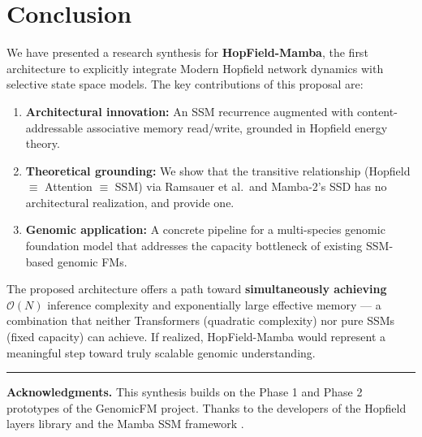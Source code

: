 \documentclass[11pt,a4paper]{article}
\numberwithin{equation}{section}
\begin{document}
\section{Conclusion}
\label{sec:conclusion}

We have presented a research synthesis for \textbf{HopField-Mamba}, the first architecture
to explicitly integrate Modern Hopfield network dynamics with selective state space models.
The key contributions of this proposal are:

\begin{enumerate}
    \item \textbf{Architectural innovation:} An SSM recurrence augmented with
    content-addressable associative memory read/write, grounded in Hopfield energy
    theory.
    \item \textbf{Theoretical grounding:} We show that the transitive relationship
    (Hopfield $\equiv$ Attention $\equiv$ SSM) via Ramsauer et al.\ and Mamba-2's SSD
    has no architectural realization, and provide one.
    \item \textbf{Genomic application:} A concrete pipeline for a multi-species genomic
    foundation model that addresses the capacity bottleneck of existing SSM-based
    genomic FMs.
\end{enumerate}

The proposed architecture offers a path toward \textbf{simultaneously achieving}
$\mathcal{O}(N)$ inference complexity and exponentially large effective memory --- a
combination that neither Transformers (quadratic complexity) nor pure SSMs (fixed
capacity) can achieve. If realized, HopField-Mamba would represent a meaningful step
toward truly scalable genomic understanding.

\medskip
\begin{center}
\rule{0.3\textwidth}{0.5pt}
\end{center}
\medskip

\noindent\textbf{Acknowledgments.} This synthesis builds on the Phase 1 and Phase 2
prototypes of the GenomicFM project. Thanks to the developers of the Hopfield layers
library \cite{hopfieldlayers} and the Mamba SSM framework \cite{mambassm}.
\end{document}
